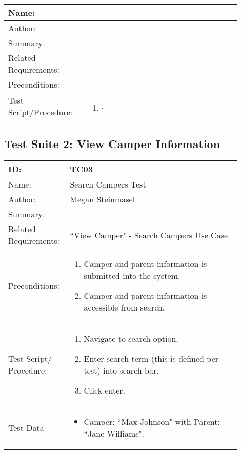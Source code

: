 \documentclass[11pt]{article}
\begin{document}
\begin{table}[H]
\begin{center}
\begin{tabular}{p{0.30\linewidth}p{0.60\linewidth}}
	Name: & \\\hline
	Author: & \\\hline
	Summary: &  \\\hline
	Related Requirements:& \\\hline
	Preconditions:& \\\hline
	Test Script/Procedure: & \begin{enumerate}
	\item $\cdot$
	\end{enumerate}\\\hline
\end{tabular}
\label{des:}	
\end{center}
\end{table}



\subsection*{Test Suite 2: View Camper Information}

\begin{table}[H]
\begin{center}
\begin{tabular}{p{0.20\linewidth}p{0.70\linewidth}}
	ID: & TC03\\\hline
	Name: & Search Campers Test \\\hline
	Author: & Megan Steinmasel\\\hline
	Summary: &  \\\hline
	Related \hspace{5em} Requirements:& ``View Camper" - Search Campers Use Case\\\hline
	Preconditions:& \begin{enumerate}
		\item Camper and parent information is submitted into the system.
		\item Camper and parent information is accessible from search.
	\end{enumerate}\\\hline
	Test Script/ Procedure: & \begin{enumerate}
	\item Navigate to search option.
	\item Enter search term (this is defined per test) into search bar.
	\item Click enter.
	\end{enumerate}\\\hline
	Test Data & \begin{itemize}
	\item Camper: ``Max Johnson" with Parent: ``Jane Williams".
	\end{itemize}
\end{tabular}
\label{des:}	
\end{center}
\end{table}
\end{document}
